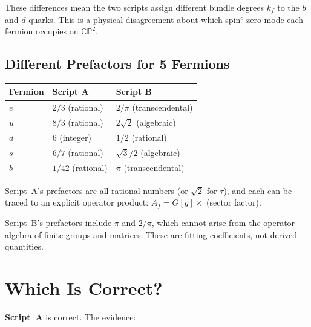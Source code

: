 \documentclass[11pt,a4paper]{article}
\newcommand{\CP}{\mathbb{CP}}
\begin{document}
These differences mean the two scripts assign different bundle degrees $k_f$
to the $b$ and $d$ quarks.  This is a physical disagreement about which
spin$^c$ zero mode each fermion occupies on $\CP^2$.

\subsection{Different Prefactors for 5 Fermions}

\begin{center}
\begin{tabular}{lll}
\toprule
Fermion & Script A & Script B \\
\midrule
$e$   & $2/3$ (rational)      & $2/\pi$ (transcendental) \\
$u$   & $8/3$ (rational)      & $2\sqrt{2}$ (algebraic) \\
$d$   & $6$ (integer)         & $1/2$ (rational) \\
$s$   & $6/7$ (rational)      & $\sqrt{3}/2$ (algebraic) \\
$b$   & $1/42$ (rational)     & $\pi$ (transcendental) \\
\bottomrule
\end{tabular}
\end{center}

Script~A's prefactors are all rational numbers (or $\sqrt{2}$ for $\tau$),
and each can be traced to an explicit operator product: $A_f = G[g] \times$
(sector factor).

Script~B's prefactors include $\pi$ and $2/\pi$, which cannot arise from
the operator algebra of finite groups and matrices.  These are fitting
coefficients, not derived quantities.

\section{Which Is Correct?}
\label{sec:correct}

\textbf{Script~A} is correct.  The evidence:
\end{document}
